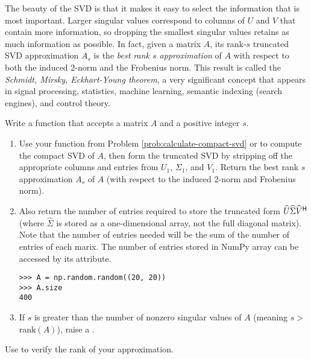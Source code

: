 The beauty of the SVD is that it makes it easy to select the information that is most important.
Larger singular values correspond to columns of $U$ and $V$ that contain more information, so dropping the smallest singular values retains as much information as possible.
In fact, given a matrix $A$, its rank-$s$ truncated SVD approximation $A_s$ is the \emph{best rank $s$ approximation} of $A$ with respect to both the induced 2-norm and the Frobenius norm.
This result is called the \emph{Schmidt, Mirsky, Eckhart-Young theorem}, a very significant concept that appears in signal processing, statistics, machine learning, semantic indexing (search engines), and control theory.

\begin{comment}
We can also calculate $A_s$ by finding the full SVD, and setting all singular values after the $k$th to zero.
Thus the modified $\Sigma$ would be
\begin{equation*}
\Sigma_{s} = \mbox{diag}(\sigma_1,\sigma_2,\ldots,\sigma_s,0,\ldots,0).
\end{equation*}
Multiplying this matrix with the original $U$ and $V\hrm$ will give the same $A_s$ that was found by computing the truncated SVD directly.
\end{comment}

\begin{problem} %
Write a function that accepts a matrix $A$ and a positive integer $s$.
\begin{enumerate}
\item Use your function from Problem \ref{prob:calculate-compact-svd} or  to compute the compact SVD of $A$, then form the truncated SVD by stripping off the appropriate columns and entries from $U_1$, $\Sigma_1$, and $V_1$.
Return the best rank $s$ approximation $A_s$ of $A$ (with respect to the induced 2-norm and Frobenius norm).
\item Also return the number of entries required to store the truncated form $\widehat{U}\widehat{\Sigma} \widehat{V}^{\mathsf H}$ (where $\widehat{\Sigma}$ is stored as a one-dimensional array, not the full diagonal matrix).
Note that the number of entries needed will be the sum of the number of entries of each marix.
The number of entries stored in NumPy array can be accessed by its  attribute.
\begin{lstlisting}
>>> A = np.random.random((20, 20))
>>> A.size
400
\end{lstlisting}
\item If $s$ is greater than the number of nonzero singular values of $A$ (meaning $s > $ rank$(A)$), raise a .
\end{enumerate}
Use  to verify the rank of your approximation.
\label{prob:svd_approx}
\end{problem}

